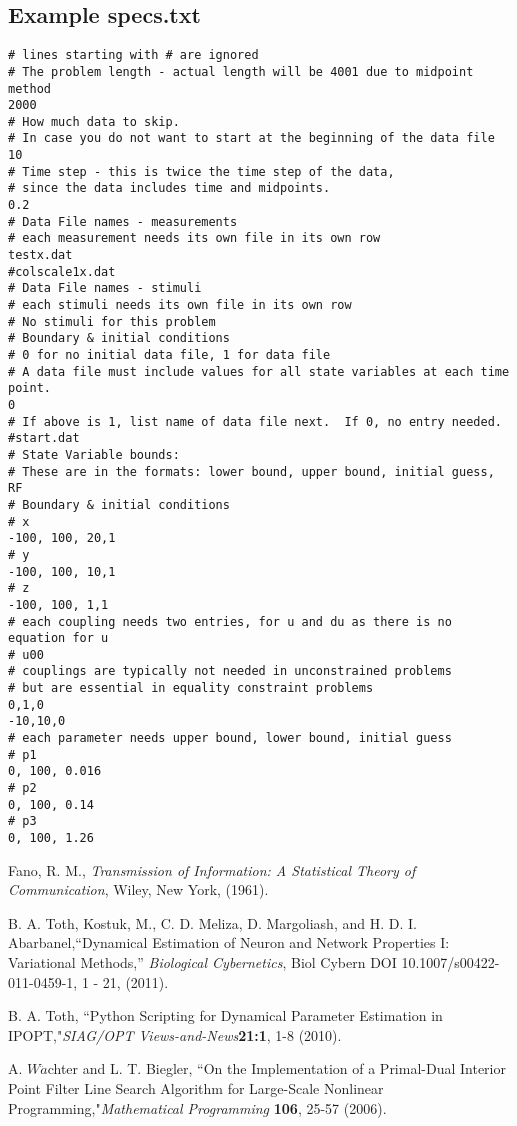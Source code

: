 \documentclass{scrartcl}
\begin{document}
\subsection*{Example specs.txt}
\begin{verbatim}
# lines starting with # are ignored
# The problem length - actual length will be 4001 due to midpoint method
2000
# How much data to skip.
# In case you do not want to start at the beginning of the data file
10
# Time step - this is twice the time step of the data,
# since the data includes time and midpoints.
0.2
# Data File names - measurements
# each measurement needs its own file in its own row
testx.dat
#colscale1x.dat
# Data File names - stimuli
# each stimuli needs its own file in its own row
# No stimuli for this problem
# Boundary & initial conditions
# 0 for no initial data file, 1 for data file
# A data file must include values for all state variables at each time point.
0
# If above is 1, list name of data file next.  If 0, no entry needed.
#start.dat
# State Variable bounds:
# These are in the formats: lower bound, upper bound, initial guess, RF
# Boundary & initial conditions
# x
-100, 100, 20,1
# y
-100, 100, 10,1
# z
-100, 100, 1,1
# each coupling needs two entries, for u and du as there is no equation for u
# u00 
# couplings are typically not needed in unconstrained problems
# but are essential in equality constraint problems
0,1,0
-10,10,0
# each parameter needs upper bound, lower bound, initial guess
# p1
0, 100, 0.016
# p2
0, 100, 0.14
# p3
0, 100, 1.26
\end{verbatim}

\begin{thebibliography}{99}
 Fano, R. M.,   {\em Transmission of Information: A Statistical Theory of Communication}, Wiley, New York, (1961).

 B. A. Toth, Kostuk, M., C. D. Meliza, D. Margoliash, and H. D. I. Abarbanel,``Dynamical Estimation of Neuron and Network Properties I: Variational Methods,''  {\em Biological Cybernetics}, Biol Cybern
DOI 10.1007/s00422-011-0459-1, 1 - 21, (2011).

 B. A. Toth, ``Python Scripting for Dynamical Parameter Estimation in IPOPT,"{\em SIAG/OPT Views-and-News}{\bf 21:1}, 1-8 (2010).

 A. $W\ddot{a}$chter and L. T. Biegler, ``On the Implementation of a Primal-Dual
Interior Point Filter Line Search Algorithm for Large-Scale Nonlinear Programming,"{\em Mathematical
Programming }{\bf 106}, 25-57 (2006).

\end{thebibliography}
\end{document}
